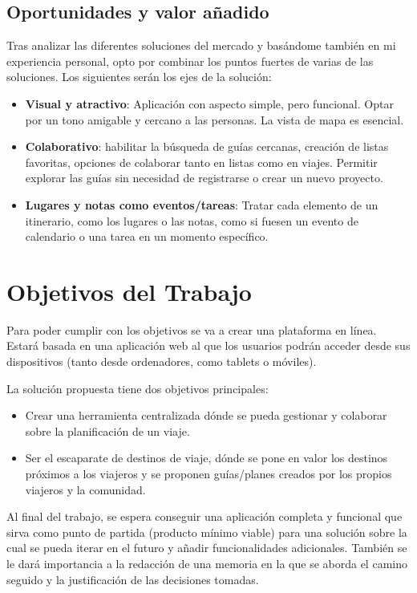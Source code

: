 \subsection{Oportunidades y valor añadido} 
Tras analizar las diferentes soluciones del mercado y basándome también en mi experiencia personal, opto por combinar los puntos fuertes de varias de las soluciones. Los siguientes serán los ejes de la solución:
\begin{itemize}
	\item \textbf{Visual y atractivo}: Aplicación con aspecto simple, pero funcional. Optar por un tono amigable y cercano a las personas. La vista de mapa es esencial.
	\item \textbf{Colaborativo}: habilitar la búsqueda de guías cercanas, creación de listas favoritas, opciones de colaborar tanto en listas como en viajes. Permitir explorar las guías sin necesidad de registrarse o crear un nuevo proyecto.
	\item \textbf{Lugares y notas como eventos/tareas}: Tratar cada elemento de un itinerario, como los lugares o las notas, como si fuesen un evento de calendario o una tarea en un momento específico. 
\end{itemize}


\section{Objetivos del Trabajo}
Para poder cumplir con los objetivos se va a crear una plataforma en línea. Estará basada en una aplicación web al que los usuarios podrán acceder desde sus dispositivos (tanto desde ordenadores, como tablets o móviles).

La solución propuesta tiene dos objetivos principales:
\begin{itemize}
	\item Crear una herramienta centralizada dónde se pueda gestionar y colaborar sobre la planificación de un viaje.
	\item Ser el escaparate de destinos de viaje, dónde se pone en valor los destinos próximos a los viajeros y se proponen guías/planes creados por los propios viajeros y la comunidad.
\end{itemize}

Al final del trabajo, se espera conseguir una aplicación completa y funcional que sirva como punto de partida (producto mínimo viable) para una solución sobre la cual se pueda iterar en el futuro y añadir funcionalidades adicionales. También se le dará importancia a la redacción de una memoria en la que se aborda el camino seguido y la justificación de las decisiones tomadas. 


